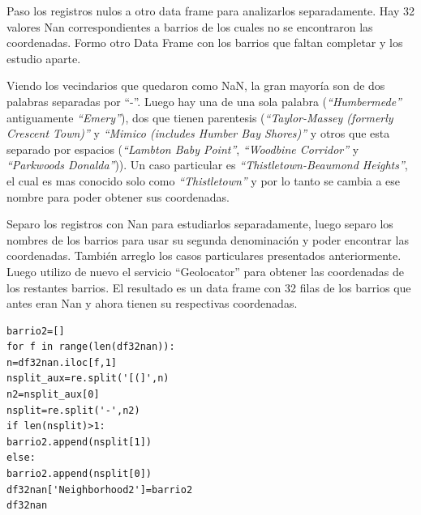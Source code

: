 \documentclass[10pt,a4paper,arial, spanish]{article}
\begin{document}
Paso los registros nulos a otro data frame para analizarlos separadamente.
Hay 32 valores Nan correspondientes a barrios de los cuales no se encontraron las coordenadas. Formo otro Data Frame con los barrios que faltan completar y los estudio aparte.

Viendo los vecindarios que quedaron como NaN, la gran mayoría son de dos palabras separadas por ``-''. Luego hay una de una sola palabra (\emph{``Humbermede''} antiguamente \emph{``Emery''}), dos que tienen parentesis (\emph{``Taylor-Massey (formerly Crescent Town)''} y \emph{``Mimico (includes Humber Bay Shores)''} y otros que esta separado por espacios (\emph{``Lambton Baby Point''}, \emph{``Woodbine Corridor''} y \emph{``Parkwoods Donalda''})). Un caso particular es \emph{``Thistletown-Beaumond Heights''}, el cual es mas conocido solo como \emph{``Thistletown''} y por lo tanto se cambia a ese nombre para poder obtener sus coordenadas.

Separo los registros con Nan para estudiarlos separadamente, luego separo los nombres de los barrios para usar su segunda denominación y poder encontrar las coordenadas. También arreglo los casos particulares presentados anteriormente. Luego utilizo de nuevo el servicio ``Geolocator'' para obtener las coordenadas de los restantes barrios. El resultado es un data frame con 32 filas de los barrios que antes eran Nan y ahora tienen su respectivas coordenadas.
\begin{verbatim}
barrio2=[]
for f in range(len(df32nan)):
n=df32nan.iloc[f,1]
nsplit_aux=re.split('[(]',n)
n2=nsplit_aux[0]
nsplit=re.split('-',n2)
if len(nsplit)>1:
barrio2.append(nsplit[1])
else:
barrio2.append(nsplit[0])
df32nan['Neighborhood2']=barrio2
df32nan
\end{verbatim}
\end{document}
